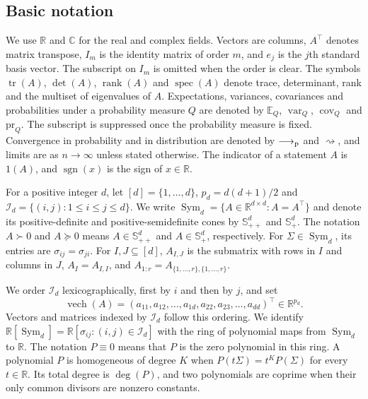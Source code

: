 \documentclass[12pt,a4paper]{article}
\theoremstyle{plain}
\theoremstyle{definition}
\newcommand{\C}{\mathbb{C}}
\newcommand{\R}{\mathbb{R}}
\newcommand{\E}{\mathbb{E}}
\newcommand{\Smat}{\mathbb{S}}
\newcommand{\Sym}{\operatorname{Sym}}
\newcommand{\tr}{\operatorname{tr}}
\newcommand{\rank}{\operatorname{rank}}
\newcommand{\spec}{\operatorname{spec}}
\newcommand{\vech}{\operatorname{vech}}
\newcommand{\sgn}{\operatorname{sgn}}
\newcommand{\var}{\operatorname{var}}
\newcommand{\cov}{\operatorname{cov}}
\newcommand{\pto}{\longrightarrow_{\rm p}}
\newcommand{\dto}{\rightsquigarrow}
\newcommand{\pr}{\mathrm{pr}}
\newcommand{\ind}{\mathrm{1}}
\begin{document}
\subsection{Basic notation}
\label{sec:notation}

We use $\R$ and $\C$ for the real and complex fields.
Vectors are columns, $A^\top$ denotes matrix transpose, $I_m$ is the identity matrix of order $m$, and $e_j$ is the $j$th standard basis vector.
The subscript on $I_m$ is omitted when the order is clear.
The symbols $\tr(A)$, $\det(A)$, $\rank(A)$ and $\spec(A)$ denote trace, determinant, rank and the multiset of eigenvalues of $A$.
Expectations, variances, covariances and probabilities under a probability measure $Q$ are denoted by $\E_Q$, $\var_Q$, $\cov_Q$ and $\pr_Q$.
The subscript is suppressed once the probability measure is fixed.
Convergence in probability and in distribution are denoted by $\pto$ and $\dto$, and limits are as $n\to\infty$ unless stated otherwise.
The indicator of a statement $A$ is $\ind(A)$, and $\sgn(x)$ is the sign of $x\in\R$.

For a positive integer $d$, let $[d]=\{1,\ldots,d\}$, $p_d=d(d+1)/2$ and $\mathcal{I}_d=\{(i,j):1\le i\le j\le d\}$.
We write $\Sym_d=\{A\in\R^{d\times d}:A=A^\top\}$ and denote its positive-definite and positive-semidefinite cones by $\Smat^d_{++}$ and $\Smat^d_+$.
The notation $A\succ0$ and $A\succeq0$ means $A\in\Smat^d_{++}$ and $A\in\Smat^d_+$, respectively.
For $\Sigma\in\Sym_d$, its entries are $\sigma_{ij}=\sigma_{ji}$.
For $I,J\subseteq[d]$, $A_{I,J}$ is the submatrix with rows in $I$ and columns in $J$, $A_I=A_{I,I}$, and $A_{1:r}=A_{\{1,\ldots,r\},\{1,\ldots,r\}}$.

We order $\mathcal{I}_d$ lexicographically, first by $i$ and then by $j$, and set
\begin{equation*}
    \vech(A)
    =
    (a_{11},a_{12},\ldots,a_{1d},a_{22},a_{23},\ldots,a_{dd})^\top
    \in
    \R^{p_d}
    .
\end{equation*}
Vectors and matrices indexed by $\mathcal{I}_d$ follow this ordering.
We identify $\R[\Sym_d]=\R[\sigma_{ij}:(i,j)\in\mathcal{I}_d]$ with the ring of polynomial maps from $\Sym_d$ to $\R$.
The notation $P\equiv0$ means that $P$ is the zero polynomial in this ring.
A polynomial $P$ is homogeneous of degree $K$ when $P(t\Sigma)=t^KP(\Sigma)$ for every $t\in\R$.
Its total degree is $\deg(P)$, and two polynomials are coprime when their only common divisors are nonzero constants.
\end{document}
